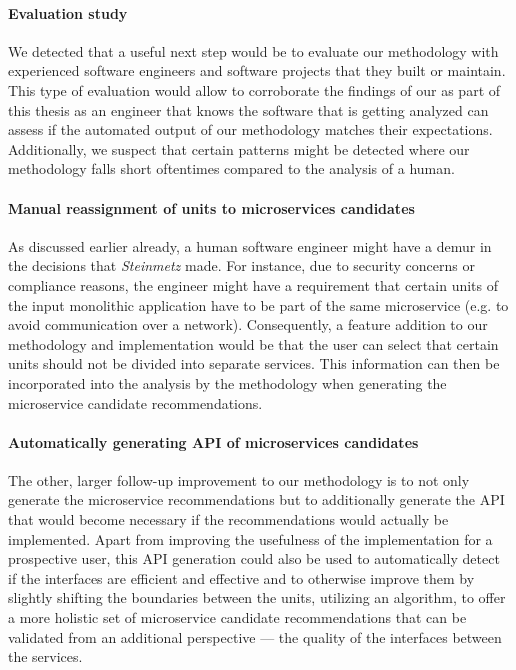 \documentclass[12pt,a4paper]{report}
\begin{document}
\paragraph{Evaluation study}
We detected that a useful next step would be to evaluate our methodology
with experienced software engineers and software projects that they built
or maintain. This type of evaluation would allow to corroborate the findings
of our \textit{} as part of this thesis as an engineer
that knows the software that is getting analyzed can assess if the automated
output of our methodology matches their expectations. Additionally, we suspect
that certain patterns might be detected where our methodology falls short oftentimes
compared to the analysis of a human.

\paragraph{Manual reassignment of units to microservices candidates}
As discussed earlier already, a human software engineer might have a demur
in the decisions that \textit{Steinmetz} made. For instance, due to
security concerns or compliance reasons, the engineer might have a requirement
that certain units of the input monolithic application have to be part of
the same microservice (e.g. to avoid communication over a network).
Consequently, a feature addition to our methodology and implementation
would be that the user can select that certain units should not be divided
into separate services. This information can then be incorporated into the
analysis by the methodology when generating the microservice candidate
recommendations.

\paragraph{Automatically generating API of microservices candidates}
The other, larger follow-up improvement to our methodology is to not only
generate the microservice recommendations but to additionally generate the
API that would become necessary if the recommendations would actually be
implemented. Apart from improving the usefulness of the implementation
for a prospective user, this API generation could also be used to
automatically detect if the interfaces are efficient and effective and
to otherwise improve them by slightly shifting the boundaries between
the units, utilizing an algorithm, to offer a more holistic set of
microservice candidate recommendations that can be validated from an
additional perspective --- the quality of the interfaces between the services.
\end{document}
